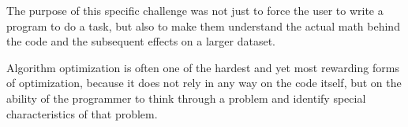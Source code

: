 The purpose of this specific challenge was not just to force the user to write a program to do a task, but also to make them understand the actual math behind the code and the subsequent effects on a larger dataset.

Algorithm optimization is often one of the hardest and yet most rewarding forms of optimization, because it does not rely in any way on the code itself, but on the ability of the programmer to think through a problem and identify special characteristics of that problem.

